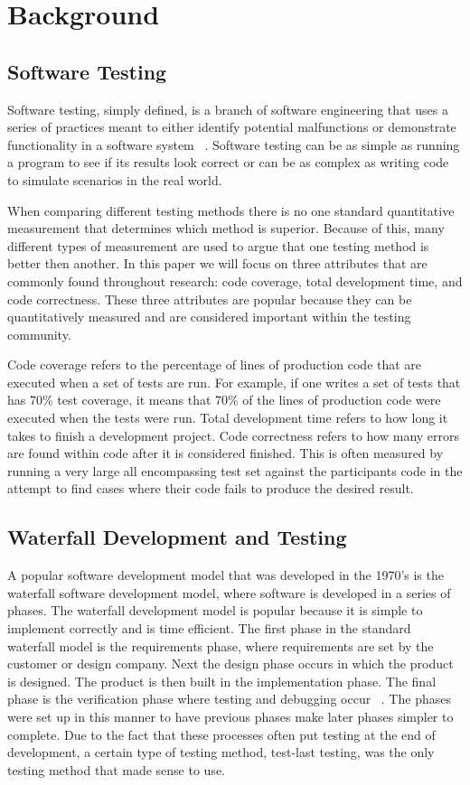 \documentclass{sig-alternate}
\begin{document}
\section{Background}
\subsection{Software Testing}
Software testing, simply defined, is a branch of software engineering that uses a series of practices meant to either identify potential malfunctions or demonstrate functionality in a software system ~\cite{Bertolino:2007}.  Software testing can be as simple as running a program to see if its results look correct or can be as complex as writing code to simulate scenarios in the real world.

When comparing different testing methods there is no one standard quantitative measurement that determines which method is superior.  Because of this, many different types of measurement are used to argue that one testing method is better then another.  In this paper we will focus on three attributes that are commonly found throughout research: code coverage, total development time, and code correctness.   These three attributes are popular because they can be quantitatively measured and are considered important within the testing community.

Code coverage refers to the percentage of lines of production code that are executed when a set of tests are run. For example, if one writes a set of tests that has 70\% test coverage, it means that 70\% of the lines of production code were executed when the tests were run.  Total development time refers to how long it takes to finish a development project.  Code correctness refers to how many errors are found within code after it is considered finished.  This is often measured by running a very large all encompassing test set against the participants code in the attempt to find cases where their code fails to produce the desired result. 

\subsection{Waterfall Development and Testing}

A popular software development model that was developed in the 1970's is the waterfall software development model, where software is developed in a series of phases.  The waterfall development model is popular because it is simple to implement correctly and is time efficient. The first phase in the standard waterfall model is the requirements phase, where requirements are set by the customer or design company.  Next the design phase occurs in which the product is designed. The product is then built in the implementation phase.  The final phase is the verification phase where testing and debugging occur ~\cite{wiki:xxx}.  The phases were set up in this manner to have previous phases make later phases simpler to complete.  Due to the fact that these processes often put testing at the end of development, a certain type of testing method, test-last testing, was the only testing method that made sense to use.
\end{document}
